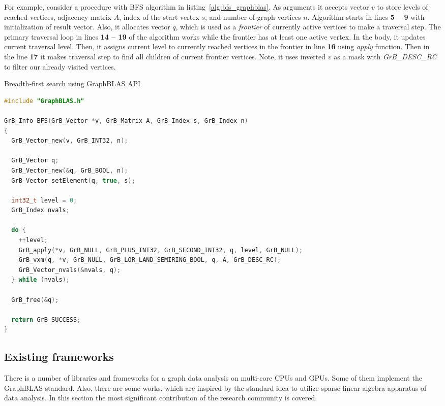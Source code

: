 For example, consider a procedure with BFS algorithm in listing~\ref{alg:bfs_graphblas}. As arguments it accepts vector $v$ to store levels of reached vertices, adjacency matrix $A$, index of the start vertex $s$, and number of graph vertices $n$. Algorithm starts in lines \textbf{5 -- 9} with initialization of result vector. Also, it allocates vector $q$, which is used as a \textit{frontier} of currently active vertices to make a traversal step. The primary traversal loop in lines \textbf{14 -- 19} of the algorithm works while the frontier has at least one active vertex. In the body, it updates current traversal level. Then, it assigns current level to currently reached vertices in the frontier in line \textbf{16} using \textit{apply} function. Then in the line \textbf{17} it makes traversal step to find all children of current frontier vertices. Note, it uses inverted $v$ as a mask with \textit{GrB\_DESC\_RC} to filter our already visited vertices.

\lstset{style=codelistingstyle}

\begin{algorithm}[]
\caption{Breadth-first search using GraphBLAS API}
\label{alg:bfs_graphblas}
\begin{lstlisting}[language=C++]
#include "GraphBLAS.h"

GrB_Info BFS(GrB_Vector *v, GrB_Matrix A, GrB_Index s, GrB_Index n)
{
  GrB_Vector_new(v, GrB_INT32, n);

  GrB_Vector q;
  GrB_Vector_new(&q, GrB_BOOL, n);
  GrB_Vector_setElement(q, true, s); 

  int32_t level = 0;
  GrB_Index nvals;
  
  do {
    ++level;                                               
    GrB_apply(*v, GrB_NULL, GrB_PLUS_INT32, GrB_SECOND_INT32, q, level, GrB_NULL);       
    GrB_vxm(q, *v, GrB_NULL, GrB_LOR_LAND_SEMIRING_BOOL, q, A, GrB_DESC_RC);                           
    GrB_Vector_nvals(&nvals, q);
  } while (nvals);
  
  GrB_free(&q);

  return GrB_SUCCESS;
}
\end{lstlisting}
\end{algorithm}

\subsection{Existing frameworks}

There is a number of libraries and frameworks for a graph data analysis on multi-core CPUs and GPUs. Some of them implement the GraphBLAS standard. Also, there are some works, which are inspired by the standard idea to utilize sparse linear algebra apparatus of data analysis. In this section the most significant contribution of the research community is covered.\\

